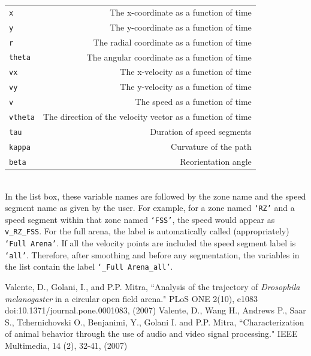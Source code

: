 \documentclass[letterpaper, 11pt]{article}
\begin{document}
\begin{tabular}{l r}
\texttt{x} & The x-coordinate as a function of time\\
\texttt{y} & The y-coordinate as a function of time\\
\texttt{r} & The radial coordinate as a function of time \\
\texttt{theta} & The angular coordinate as a function of time\\
\texttt{vx} & The x-velocity as a function of time\\
\texttt{vy} & The y-velocity as a function of time\\
\texttt{v} & The speed as a function of time\\
\texttt{vtheta} & The direction of the velocity vector as a function of time\\
\texttt{tau} & Duration of speed segments\\
\texttt{kappa} & Curvature of the path \\
\texttt{beta} & Reorientation angle
\end{tabular}\\

In the list box, these variable names are followed by the zone name and the speed segment name as
given by the user.  For example, for a zone named \texttt{`RZ'} and a speed segment within that
zone named \texttt{`FSS'}, the speed would appear as \texttt{v\_RZ\_FSS}.  For the full arena, the
label is automatically called (appropriately) \texttt{`Full Arena'}. If all the velocity points are
included the speed segment label is \texttt{`all'}.  Therefore, after smoothing and before any
segmentation, the variables in the list contain the label \texttt{`\_Full Arena\_all'}.



\begin{thebibliography}{9}
Valente, D., Golani, I., and P.P. Mitra, ``Analysis of the trajectory of \emph{Drosophila
melanogaster} in a circular open field arena." PLoS ONE 2(10), e1083
doi:10.1371/journal.pone.0001083, (2007)
Valente, D., Wang H., Andrews P., Saar S., Tchernichovski O., Benjanimi, Y., Golani I. and
P.P. Mitra, ``Characterization of animal behavior through the use of audio and video signal
processing." IEEE Multimedia, 14 (2), 32-41, (2007)
\end{thebibliography}
\end{document}
